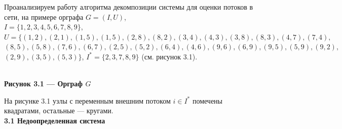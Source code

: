 \documentclass[14pt]{extarticle}%
\begin{document}
Проанализируем работу алгоритма декомпозиции системы для оценки потоков в сети, на примере орграфа $G=(I,U)$,\\ $I=\{1,2,3,4,5,6,7,8,9\}$, \\$U=\{(1,2), (2,1), (1,5),(1,5), (2,8),(8,2), (3,4),(4,3), (3,8), (8,3), (4,7),(7,4),$\\ $(8,5), (5,8), (7,6), (6,7), (2,5),(5,2), (6,4),(4,6), (9,6),(6,9), (9,5),(5,9), (9,2),$\\$(2,9), (3,5),(5,3)\}$, $I^*=\{2,3,7,8,9\}$ (см. рисунок 3.1).

\begin{center}
\\
\textbf{Рисунок 3.1 --- Орграф $G$}
\end{center}

На рисунке 3.1 узлы с переменным внешним потоком $i\in I^*$ помечены квадратами, остальные --- кругами.\\

\textbf{3.1 Недоопределенная система}
\end{document}
